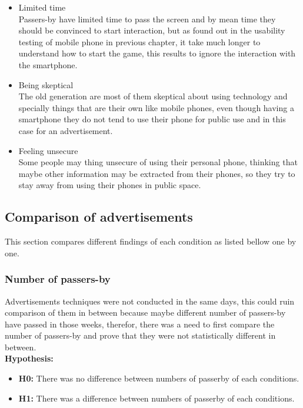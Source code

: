 \begin{enumerate}
\begin{itemize}
\item Limited time \\
Passers-by have limited time to pass the screen and by mean time they should be convinced to start interaction, but as found out in the usability testing of mobile phone in previous chapter, it take much longer to understand how to start the game, this results to ignore the interaction with the smartphone. 

\item Being skeptical \\
The old generation are most of them skeptical about using technology and specially things that are their own like mobile phones, even though having a smartphone they do not tend to use their phone for public use and in this case for an advertisement. 

\item Feeling unsecure \\
Some people may thing unsecure of using their personal phone, thinking that maybe other information may be extracted from their phones, so they try to stay away from using their phones in public space. 


\end{itemize}

\end{enumerate}


\newpage
\subsection{Comparison of advertisements}
This section compares different findings of each condition as listed bellow one by one. 

\subsubsection {Number of passers-by}
Advertisements techniques were not conducted in the same days, this could ruin comparison of them in between because maybe different number of passers-by have passed in those weeks, therefor, there was a need to first compare the number of passers-by and prove that they were not statistically different in between. \\

\textbf{Hypothesis:}
\begin{itemize}
\item \textbf{H0:} There was no difference between numbers of passerby of each conditions.
\item \textbf{H1:} There was a difference between numbers of passerby of each conditions.
\end{itemize}

